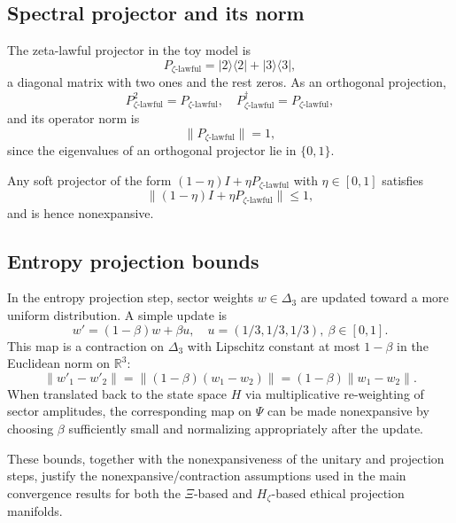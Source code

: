 \documentclass[11pt]{article}
\begin{document}
\subsection{Spectral projector and its norm}

The zeta-lawful projector in the toy model is
\[
  P_{\zeta\text{-lawful}} = |2\rangle\langle 2| + |3\rangle\langle 3|,
\]
a diagonal matrix with two ones and the rest zeros. As an orthogonal projection,
\[
  P_{\zeta\text{-lawful}}^2 = P_{\zeta\text{-lawful}},\quad
  P_{\zeta\text{-lawful}}^\dagger = P_{\zeta\text{-lawful}},
\]
and its operator norm is
\[
  \|P_{\zeta\text{-lawful}}\| = 1,
\]
since the eigenvalues of an orthogonal projector lie in $\{0,1\}$.

Any soft projector of the form $(1-\eta)I + \eta P_{\zeta\text{-lawful}}$ with $\eta\in[0,1]$ satisfies
\[
  \|(1-\eta)I + \eta P_{\zeta\text{-lawful}}\| \le 1,
\]
and is hence nonexpansive.

\subsection{Entropy projection bounds}

In the entropy projection step, sector weights $w\in\Delta_3$ are updated toward a more uniform distribution. A simple update is
\[
  w' = (1-\beta)w + \beta u,\quad u=(1/3,1/3,1/3),\ \beta\in[0,1].
\]
This map is a contraction on $\Delta_3$ with Lipschitz constant at most $1-\beta$ in the Euclidean norm on $\mathbb{R}^3$:
\[
  \|w'_1 - w'_2\| = \|(1-\beta)(w_1 - w_2)\| = (1-\beta)\|w_1 - w_2\|.
\]
When translated back to the state space $H$ via multiplicative re-weighting of sector amplitudes, the corresponding map on $\Psi$ can be made nonexpansive by choosing $\beta$ sufficiently small and normalizing appropriately after the update.

\bigskip

These bounds, together with the nonexpansiveness of the unitary and projection steps, justify the nonexpansive/contraction assumptions used in the main convergence results for both the $\Xi$-based and $H_\zeta$-based ethical projection manifolds.


\nocite{*}


\end{document}
